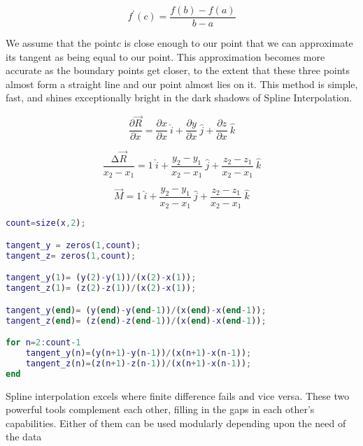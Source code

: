 \documentclass[a4paper]{article}
\begin{document}
\[f^{'}(c) = \frac{f(b) - f(a)}{b - a}\]

We assume that the point\(c\) is close enough to our point that we can approximate its tangent as being equal to our point. This approximation becomes more accurate as the boundary points get closer, to the extent that these three points almost form a straight line and our point almost lies on it.
This method is simple, fast, and shines exceptionally bright in the dark shadows of Spline Interpolation.

\[\frac{\partial\vec{R}}{\partial x} = \frac{\partial x}{\partial x}\ \hat{i} + \frac{\partial y}{\partial x}\ \hat{j} + \frac{\partial z}{\partial x}\ \hat{k}\]

\[\frac{\mathrm{\Delta}\vec{R}}{x_{2} - x_{1}} = 1\ \hat{i} + \frac{y_{2} - y_{1}}{x_{2} - x_{1}}\ \hat{j} + \frac{z_{2} - z_{1}}{x_{2} - x_{1}}\ \hat{k}\]

\[\vec{M} = 1\ \hat{i} + \frac{y_{2} - y_{1}}{x_{2} - x_{1}}\ \hat{j} + \frac{z_{2} - z_{1}}{x_{2} - x_{1}}\ \hat{k}\]

\begin{lstlisting}[language=matlab]
count=size(x,2);

tangent_y = zeros(1,count);
tangent_z= zeros(1,count);

tangent_y(1)= (y(2)-y(1))/(x(2)-x(1));
tangent_z(1)= (z(2)-z(1))/(x(2)-x(1));

tangent_y(end)= (y(end)-y(end-1))/(x(end)-x(end-1));
tangent_z(end)= (z(end)-z(end-1))/(x(end)-x(end-1));

for n=2:count-1
    tangent_y(n)=(y(n+1)-y(n-1))/(x(n+1)-x(n-1));
    tangent_z(n)=(z(n+1)-z(n-1))/(x(n+1)-x(n-1));
end

\end{lstlisting}

Spline interpolation excels where finite difference fails and vice versa. These two powerful tools complement each other, filling in the gaps in each other’s capabilities. Either of them can be used modularly depending upon the need of the data
\pagebreak
\end{document}

